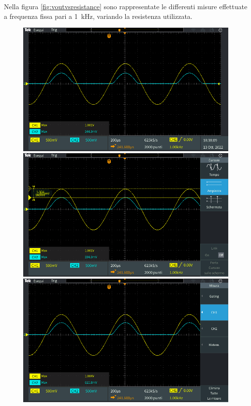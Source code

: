 \noindent
Nella figura \ref{fig:voutvsresistance} sono rappresentate le differenti misure effettuate a frequenza fissa pari a \SI{1}{\kilo\hertz}, variando la resistenza utilizzata.
\begin{figure}[h]
	\centering
	\begin{minipage}{.496\textwidth}
				\includegraphics[width=\linewidth]{./ImageFiles/Laboratorio 2/TEK00000.PNG}
	\end{minipage}
	\begin{minipage}{.496\textwidth}
		\includegraphics[width=\linewidth]{./ImageFiles/Laboratorio 2/TEK00009.PNG}
	\end{minipage}
	\begin{minipage}{.496\textwidth}
	\includegraphics[width=\linewidth]{./ImageFiles/Laboratorio 2/TEK00003.PNG}

\end{minipage}
\end{figure}
